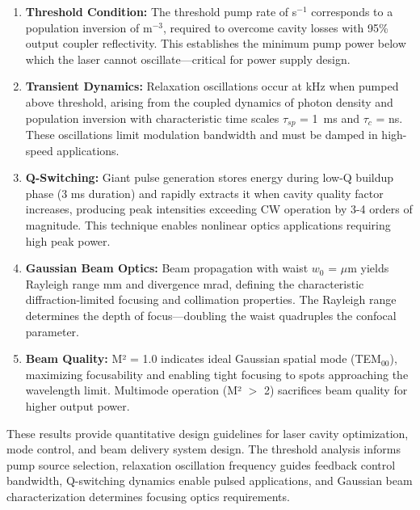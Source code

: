 \documentclass[a4paper, 11pt]{article}
\begin{document}
\begin{enumerate}
\item \textbf{Threshold Condition:} The threshold pump rate of  s$^{-1}$
corresponds to a population inversion of  m$^{-3}$,
required to overcome cavity losses with 95\% output coupler reflectivity. This establishes
the minimum pump power below which the laser cannot oscillate—critical for power supply design.

\item \textbf{Transient Dynamics:} Relaxation oscillations occur at  kHz
when pumped above threshold, arising from the coupled dynamics of photon density and population
inversion with characteristic time scales $\tau_{sp}$ = \SI{1}{\milli\second} and
$\tau_c$ =  ns. These oscillations limit modulation bandwidth
and must be damped in high-speed applications.

\item \textbf{Q-Switching:} Giant pulse generation stores energy during low-Q buildup
phase (3 ms duration) and rapidly extracts it when cavity quality factor increases,
producing peak intensities exceeding CW operation by 3-4 orders of magnitude. This technique
enables nonlinear optics applications requiring high peak power.

\item \textbf{Gaussian Beam Optics:} Beam propagation with waist $w_0$ =  $\mu$m
yields Rayleigh range  mm and divergence  mrad,
defining the characteristic diffraction-limited focusing and collimation properties. The Rayleigh
range determines the depth of focus—doubling the waist quadruples the confocal parameter.

\item \textbf{Beam Quality:} M² = 1.0 indicates ideal Gaussian spatial mode (TEM$_{00}$),
maximizing focusability and enabling tight focusing to spots approaching the wavelength
limit. Multimode operation (M² $>$ 2) sacrifices beam quality for higher output power.
\end{enumerate}

These results provide quantitative design guidelines for laser cavity optimization,
mode control, and beam delivery system design. The threshold analysis informs pump
source selection, relaxation oscillation frequency guides feedback control bandwidth,
Q-switching dynamics enable pulsed applications, and Gaussian beam characterization
determines focusing optics requirements.
\end{document}
